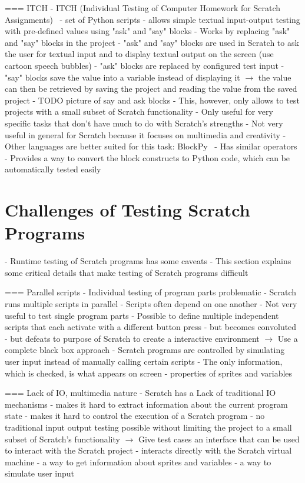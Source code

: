 === ITCH
- ITCH (Individual Testing of Computer Homework for Scratch Assignments)~\cite{itch}
- set of Python scripts
- allows simple textual input-output testing with pre-defined values using "ask" and "say" blocks
- Works by replacing "ask" and "say" blocks in the project
    - "ask" and "say" blocks are used in Scratch to ask the user for textual input and to display textual output on the screen
      (use cartoon speech bubbles)
    - "ask" blocks are replaced by configured test input
    - "say" blocks save the value into a variable instead of displaying it
    $\rightarrow$ the value can then be retrieved by saving the project and reading the value from the saved project
    - TODO picture of say and ask blocks
- This, however, only allows to test projects with a small subset of Scratch functionality
- Only useful for very specific tasks that don't have much to do with Scratch's strengths
- Not very useful in general for Scratch because it focuses on multimedia and creativity
- Other languages are better suited for this task: BlockPy~\cite{blockpy}
    - Has similar operators
    - Provides a way to convert the block constructs to Python code, which can be automatically tested easily

\section{Challenges of Testing Scratch Programs}
- Runtime testing of Scratch programs has some caveats
- This section explains some critical details that make testing of Scratch programs difficult

=== Parallel scripts
- Individual testing of program parts problematic
    - Scratch runs multiple scripts in parallel
        - Scripts often depend on one another
    - Not very useful to test single program parts
    - Possible to define multiple independent scripts that each activate with a different button press
        - but becomes convoluted
        - but defeats to purpose of Scratch to create a interactive environment
$\rightarrow$ Use a complete black box approach
    - Scratch programs are controlled by simulating user input instead of manually calling certain scripts
    - The only information, which is checked, is what appears on screen
        - properties of sprites and variables

=== Lack of IO, multimedia nature
- Scratch has a Lack of traditional IO mechanisms
    - makes it hard to extract information about the current program state
    - makes it hard to control the execution of a Scratch program
    - no traditional input output testing possible without limiting the project to a small subset of Scratch's functionality
$\rightarrow$ Give test cases an interface that can be used to interact with the Scratch project
    - interacts directly with the Scratch virtual machine
    - a way to get information about sprites and variables
    - a way to simulate user input

